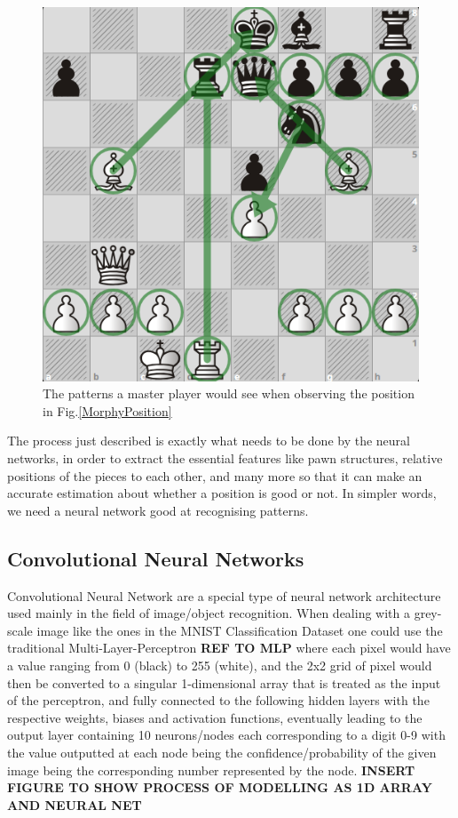 \begin{figure}[H]
    \centering
    \includegraphics[scale=0.45]{images/MorphyAnotated.png}
    \caption{The patterns a master player would see when observing the position in Fig.\ref{MorphyPosition}}
    \label{MorphyAnotated}
\end{figure}

The process just described is exactly what needs to be done by the neural networks, in order to extract the essential features like pawn structures, relative positions of the pieces to each other, and many more so that it can make an accurate estimation about whether a position is good or not. In simpler words, we need a neural network good at recognising patterns.

\subsection{Convolutional Neural Networks}
Convolutional Neural Network are a special type of neural network architecture used mainly in the field of image/object recognition. When dealing with a grey-scale image like the ones in the MNIST Classification Dataset \cite{MNIST} one could use the traditional Multi-Layer-Perceptron \textbf{REF TO MLP} where each pixel would have a value ranging from 0 (black) to 255 (white), and the 2x2 grid of pixel would then be converted to a singular 1-dimensional array that is treated as the input of the perceptron, and fully connected to the following hidden layers with the respective weights, biases and activation functions, eventually leading to the output layer containing 10 neurons/nodes each corresponding to a digit 0-9 with the value outputted at each node being the confidence/probability of the given image being the corresponding number represented by the node. \textbf{INSERT FIGURE TO SHOW PROCESS OF MODELLING AS 1D ARRAY AND NEURAL NET}

